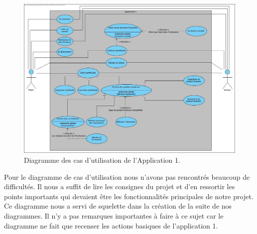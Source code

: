 \documentclass[../rapport.tex]{subfiles}
\begin{document}
		\begin{figure}[h]
				\centering \includegraphics[scale=0.3]{ressources/photos_diagrammes/app1/use_case_app1.jpg}
				\caption{Diagramme des cas d'utilisation de l'Application 1.}
		\end{figure}

		Pour le diagramme de cas d'utilisation nous n'avons pas rencontrés beaucoup de difficultés. Il nous a suffit de lire les consignes du projet et d'en ressortir 
		les points importants qui devaient être les fonctionnalités principales de notre projet. Ce diagramme nous a servi de squelette dans la création de la suite 
		de nos diagrammes. Il n'y a pas remarques importantes à faire à ce sujet car le diagramme ne fait que recenser les actions basiques de l'application 1.
\end{document}
